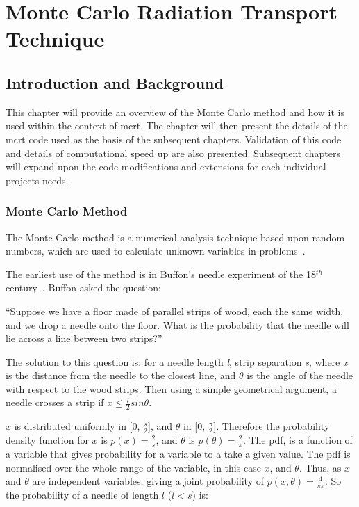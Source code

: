 \chapter{Monte Carlo Radiation Transport Technique}
\label{sec:mcrt}
\section{Introduction and Background}
This chapter will provide an overview of the Monte Carlo method and how it is used within the context of \gls*{mcrt}. The chapter will then present the details of the \gls*{mcrt} code used as the basis of the subsequent chapters. Validation of this code and details of computational speed up are also presented. Subsequent chapters will expand upon the code modifications and extensions for each individual projects needs.

\subsection*{Monte Carlo Method}\label{sec:mcmethod}
The Monte Carlo method is a numerical analysis technique based upon random numbers, which are used to calculate unknown variables in problems~\cite{cashwell1959practical,rogers1990monte}. 

The earliest use of the method is in Buffon's needle experiment of the 18$^{th}$ century~\cite{badger1994lazzarini,beckmann2015history,buffon1785histoire}. Buffon asked the question;

\medskip

``Suppose we have a floor made of parallel strips of wood, each the same width, and we drop a needle onto the floor. What is the probability that the needle will lie across a line between two strips?''

\medskip

The solution to this question is:
for a needle length \textit{l}, strip separation \textit{s}, where \textit{x} is the distance from the needle to the closest line, and $\theta$ is the angle of the needle with respect to the wood strips. Then using a simple geometrical argument, a needle crosses a strip if $x \leq \tfrac{l}{2} sin \theta$.

$x$ is distributed uniformly in [0, $\tfrac{s}{2}$], and $\theta$ in [0, $\tfrac{\pi}{2}$]. Therefore the probability density function for $x$ is $p(x)=\tfrac{2}{s}$, and $\theta$ is $p(\theta) = \tfrac{2}{\pi}$. The \gls*{pdf}, is a function of a variable that gives probability for a variable to a take a given value. The \gls*{pdf} is normalised over the whole range of the variable, in this case $x$, and $\theta$.
Thus, as $x$ and $\theta$ are independent variables, giving a joint probability of $p(x,\theta) = \tfrac{4}{s \pi}$.
So the probability of a needle of length $l$ ($l<s$) is:

